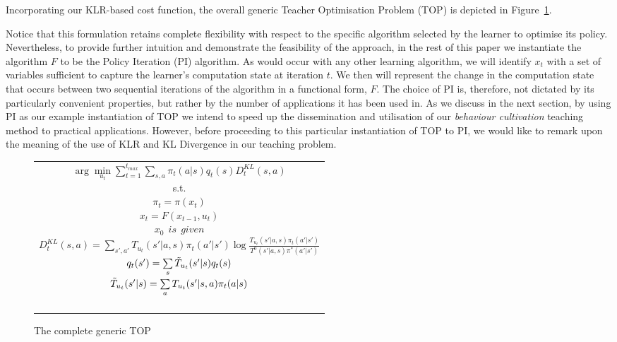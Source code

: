 Incorporating our KLR-based cost function, the overall generic Teacher
Optimisation Problem (TOP) is depicted in Figure~\ref{t_opt}. 

Notice that this formulation retains complete flexibility with respect
to the specific algorithm selected by the learner to optimise its
policy. Nevertheless, to provide further intuition and demonstrate the
feasibility of the approach, in the rest of this paper we instantiate
the algorithm $F$ to be the Policy Iteration (PI) algorithm. As would
occur with any other learning algorithm, we will identify $x_t$ with a
set of variables sufficient to capture the learner's computation state
at iteration $t$. We then will represent the change in the computation
state that occurs between two sequential iterations of the algorithm in
a functional form, $F$. The choice of PI is, therefore, not dictated
by its particularly convenient properties, but rather by the number of
applications it has been used in. As we discuss in the next section,
by using PI as our example instantiation of TOP we intend to speed up the 
dissemination and utilisation of our {\em behaviour cultivation}
teaching method to practical applications. However, before proceeding
to this particular instantiation of TOP to PI, we would like to remark
upon the meaning of the use of KLR and KL Divergence in our teaching
problem.

\begin{figure}[ht]
\begin{tabular}{|c|} \hline \parbox{3.2 in} {\center 
$\arg\min\limits_{u_t}\sum\limits_{t=1}^{t_{max}}\sum\limits_{s,a}\pi_t(a|s)q_t(s)D^{KL}_t(s,a)$\\
s.t.\\
$\pi_t=\pi(x_t)$\\
$x_t=F(x_{t-1},u_t)$\\
$x_0\ \ \displaystyle{is\ \ given}$\\
$D^{KL}_t(s,a)=\sum\limits_{s',a'}T_{u_t}(s'|a,s)\pi_t(a'|s')\log\frac{T_{u_t}(s'|a,s)\pi_t(a'|s')}{T^0(s'|a,s)\pi^*(a'|s')}$\\
$q_t(s')=\sum\limits_s\Tilde{T}_{u_t}(s'|s)q_t(s)$\\
$\Tilde{T}_{u_t}(s'|s)=\sum\limits_aT_{u_t}(s'|s,a)\pi_t(a|s)$\\\ \\
}\\ \hline \end{tabular}
\caption{\label{t_opt}The complete generic TOP}
\end{figure}

